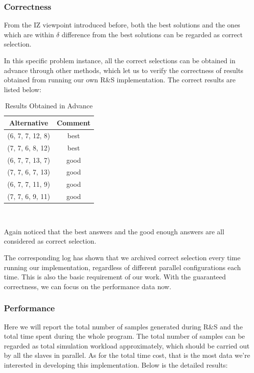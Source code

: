 \documentclass[12pt,a4paper]{report}
\begin{document}
\subsubsection{Correctness}

From the IZ viewpoint introduced before, both the best solutions and the ones which are within $\delta$ difference from the best solutions can be regarded as correct selection.

In this specific problem instance, all the correct selections can be obtained in advance through other methods, which let us to verify the correctness of results obtained from running our own R\&S implementation. The correct results are listed below:

\begin{table}[ht]
\begin{center}
\begin{tabular}{|c|c|}
\hline
Alternative & Comment \\
\hline
(6, 7, 7, 12, 8) & best \\
(7, 7, 6, 8, 12) & best \\
(6, 7, 7, 13, 7) & good \\
(7, 7, 6, 7, 13) & good \\
(6, 7, 7, 11, 9) & good \\
(7, 7, 6, 9, 11) & good \\
\hline
\end{tabular} \\
\caption{Results Obtained in Advance}
\end{center}
\end{table}

Again noticed that the best answers and the good enough answers are all considered as correct selection.

The corresponding log has shown that we archived correct selection every time running our implementation, regardless of different parallel configurations each time. This is also the basic requirement of our work. With the guaranteed correctness, we can focus on the performance data now.

\subsubsection{Performance}

Here we will report the total number of samples generated during R\&S and the total time spent during the whole program. The total number of samples can be regarded as total simulation workload approximately, which should be carried out by all the slaves in parallel. As for the total time cost, that is the most data we're interested in developing this implementation. Below is the detailed results:
\end{document}
